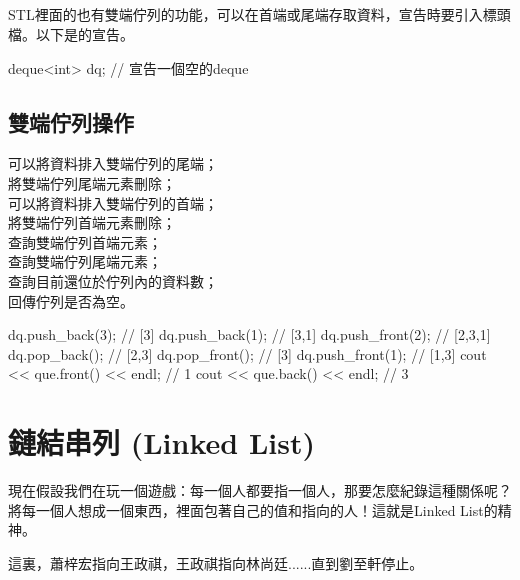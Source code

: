 \subsection{}
STL裡面的也有雙端佇列的功能，可以在首端或尾端存取資料，宣告時要引入標頭檔。以下是的宣告。
\begin{C++}
deque<int> dq; // 宣告一個空的deque
\end{C++}
\subsection{雙端佇列操作}
 可以將資料排入雙端佇列的尾端；\\
\indent{} 將雙端佇列尾端元素刪除；\\
\indent{} 可以將資料排入雙端佇列的首端；\\
\indent{} 將雙端佇列首端元素刪除；\\
\indent{} 查詢雙端佇列首端元素；\\
\indent{} 查詢雙端佇列尾端元素；\\
\indent{} 查詢目前還位於佇列內的資料數；\\
\indent{} 回傳佇列是否為空。
\begin{C++}
dq.push_back(3); // [3]
dq.push_back(1); // [3,1]
dq.push_front(2); // [2,3,1]
dq.pop_back(); // [2,3]
dq.pop_front(); // [3]
dq.push_front(1); // [1,3]
cout << que.front() << endl; // 1
cout << que.back() << endl; // 3
\end{C++}

			
\section{鏈結串列 (Linked List)}
現在假設我們在玩一個遊戲：每一個人都要指一個人，那要怎麼紀錄這種關係呢？將每一個人想成一個東西，裡面包著自己的值和指向的人！這就是Linked List的精神。
\begin{center}
\end{center}
 這裏，蕭梓宏指向王政祺，王政祺指向林尚廷......直到劉至軒停止。
